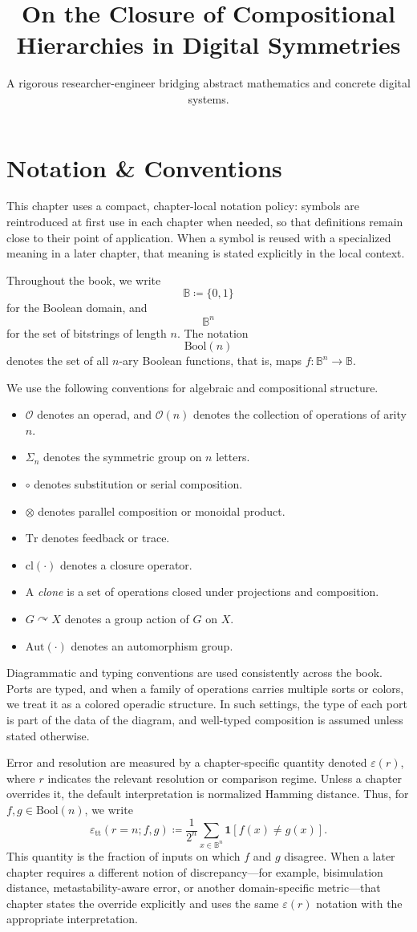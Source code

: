 \documentclass[11pt]{article}
\title{On the Closure of Compositional Hierarchies in Digital Symmetries}
\author{A rigorous researcher-engineer bridging abstract mathematics and concrete digital systems.}
\begin{document}
\section*{Notation \& Conventions}

This chapter uses a compact, chapter-local notation policy: symbols are reintroduced at first use in each chapter when needed, so that definitions remain close to their point of application. When a symbol is reused with a specialized meaning in a later chapter, that meaning is stated explicitly in the local context.

Throughout the book, we write
\[
\mathbb{B} \coloneqq \{0,1\}
\]
for the Boolean domain, and
\[
\mathbb{B}^n
\]
for the set of bitstrings of length $n$. The notation
\[
\mathrm{Bool}(n)
\]
denotes the set of all $n$-ary Boolean functions, that is, maps $f : \mathbb{B}^n \to \mathbb{B}$.

We use the following conventions for algebraic and compositional structure.
\begin{itemize}
  \item $\mathcal{O}$ denotes an operad, and $\mathcal{O}(n)$ denotes the collection of operations of arity $n$.
  \item $\Sigma_n$ denotes the symmetric group on $n$ letters.
  \item $\circ$ denotes substitution or serial composition.
  \item $\otimes$ denotes parallel composition or monoidal product.
  \item $\mathrm{Tr}$ denotes feedback or trace.
  \item $\mathrm{cl}(\cdot)$ denotes a closure operator.
  \item A \emph{clone} is a set of operations closed under projections and composition.
  \item $G \curvearrowright X$ denotes a group action of $G$ on $X$.
  \item $\mathrm{Aut}(\cdot)$ denotes an automorphism group.
\end{itemize}

Diagrammatic and typing conventions are used consistently across the book. Ports are typed, and when a family of operations carries multiple sorts or colors, we treat it as a colored operadic structure. In such settings, the type of each port is part of the data of the diagram, and well-typed composition is assumed unless stated otherwise.

Error and resolution are measured by a chapter-specific quantity denoted $\varepsilon(r)$, where $r$ indicates the relevant resolution or comparison regime. Unless a chapter overrides it, the default interpretation is normalized Hamming distance. Thus, for $f,g \in \mathrm{Bool}(n)$, we write
\[
\varepsilon_{\mathrm{tt}}(r=n; f,g)
\coloneqq \frac{1}{2^n} \sum_{x \in \mathbb{B}^n} \mathbf{1}[f(x) \neq g(x)].
\]
This quantity is the fraction of inputs on which $f$ and $g$ disagree. When a later chapter requires a different notion of discrepancy---for example, bisimulation distance, metastability-aware error, or another domain-specific metric---that chapter states the override explicitly and uses the same $\varepsilon(r)$ notation with the appropriate interpretation.
\end{document}
